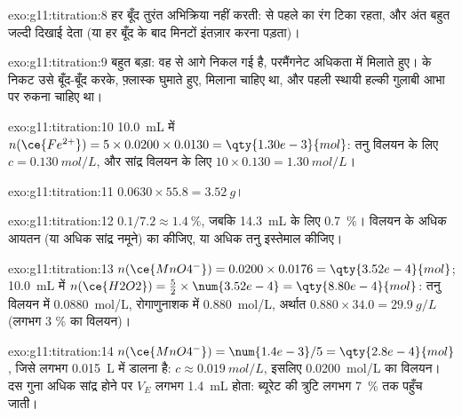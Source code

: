 \begin{solution}{exo:g11:titration:8}
हर बूँद तुरंत अभिक्रिया नहीं करती:  से पहले  का रंग
टिका रहता, और अंत बहुत जल्दी दिखाई देता (या हर बूँद के बाद
मिनटों इंतज़ार करना पड़ता)।
\end{solution}

\begin{solution}{exo:g11:titration:9}
बहुत बड़ा: वह  से आगे निकल गई है, परमैंगनेट अधिकता में मिलाते हुए।
 के निकट उसे  बूँद-बूँद करके, फ़्लास्क घुमाते हुए,
मिलाना चाहिए था, और पहली स्थायी हल्की गुलाबी आभा पर रुकना चाहिए था।
\end{solution}

\begin{solution}{exo:g11:titration:10}
\qty{10.0}{mL} में $n(\ce{Fe^{2+}}) = 5 \times 0.0200 \times 0.0130 = \qty{1.30e-3}{mol}$:
तनु विलयन के लिए $c = \qty{0.130}{mol/L}$, और
सांद्र विलयन के लिए $10 \times 0.130 = \qty{1.30}{mol/L}$।
\end{solution}

\begin{solution}{exo:g11:titration:11}
$0.0630 \times 55.8 = \qty{3.52}{g}$।
\end{solution}

\begin{solution}{exo:g11:titration:12}
$0.1 / 7.2 \approx \qty{1.4}{\percent}$, जबकि \qty{14.3}{mL} के लिए
\qty{0.7}{\percent}। विलयन के अधिक आयतन (या अधिक
सांद्र नमूने) का  कीजिए, या अधिक तनु  इस्तेमाल कीजिए।
\end{solution}

\begin{solution}{exo:g11:titration:13}
$n(\ce{MnO4^-}) = 0.0200 \times 0.0176 = \qty{3.52e-4}{mol}$;
\qty{10.0}{mL} में $n(\ce{H2O2}) = \frac{5}{2} \times \num{3.52e-4} = \qty{8.80e-4}{mol}$:
तनु विलयन में \qty{0.0880}{mol/L},
रोगाणुनाशक में \qty{0.880}{mol/L}, अर्थात
$0.880 \times 34.0 = \qty{29.9}{g/L}$ (लगभग 3 \% का विलयन)।
\end{solution}

\begin{solution}{exo:g11:titration:14}
$n(\ce{MnO4^-}) = \num{1.4e-3} / 5 = \qty{2.8e-4}{mol}$, जिसे
लगभग \qty{0.015}{L} में डालना है: $c \approx \qty{0.019}{mol/L}$, इसलिए
\qty{0.0200}{mol/L} का विलयन। दस गुना अधिक सांद्र होने पर $V_E$
लगभग \qty{1.4}{mL} होता: ब्यूरेट की त्रुटि लगभग
\qty{7}{\percent} तक पहुँच जाती।
\end{solution}

